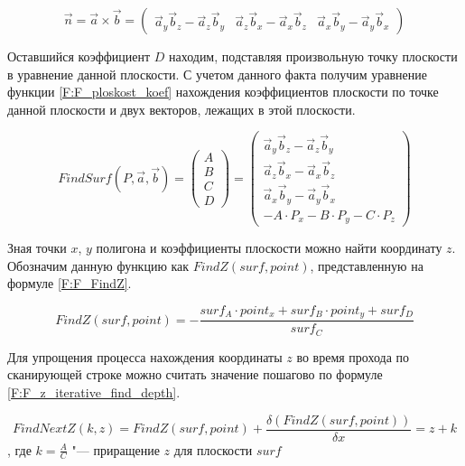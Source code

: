\begin{equation}
    \label{F:vector_scalar}
    \vec{n} = \vec{a} \times \vec{b} = \begin{pmatrix}
        \vec{a}_y \vec{b}_z - \vec{a}_z \vec{b}_y &
        \vec{a}_z \vec{b}_x - \vec{a}_x \vec{b}_z &
        \vec{a}_x \vec{b}_y - \vec{a}_y \vec{b}_x
    \end{pmatrix}
\end{equation}

Оставшийся коэффициент $D$ находим, подставляя произвольную точку плоскости в уравнение данной плоскости. С учетом данного факта получим уравнение функции \eqref{F:F_ploskost_koef} нахождения коэффициентов плоскости по точке данной плоскости и двух векторов, лежащих в этой плоскости.


\begin{equation}
    \label{F:F_ploskost_koef}
    FindSurf(P, \vec{a}, \vec{b}) =
    \begin{pmatrix}
        A \\
        B \\
        C \\
        D
    \end{pmatrix} =
    \begin{pmatrix}
        \vec{a}_y \vec{b}_z - \vec{a}_z \vec{b}_y \\
        \vec{a}_z \vec{b}_x - \vec{a}_x \vec{b}_z \\
        \vec{a}_x \vec{b}_y - \vec{a}_y \vec{b}_x \\
        -A \cdot P_x - B \cdot P_y - C \cdot P_z
    \end{pmatrix}
\end{equation}

Зная точки $x$, $y$ полигона и коэффициенты плоскости можно найти координату $z$. Обозначим данную функцию как $FindZ(surf, point)$, представленную на формуле \eqref{F:F_FindZ}.

\begin{equation}
    \label{F:F_FindZ}
    FindZ(surf, point) = -\frac{surf_A \cdot point_x + surf_B \cdot point_y + surf_D}{surf_C}
\end{equation}

Для упрощения процесса нахождения координаты $z$ во время прохода по сканирующей строке можно считать значение пошагово по формуле \eqref{F:F_z_iterative_find_depth}.

\begin{eqndesc}
    \begin{equation}
        \label{F:F_z_iterative_find_depth}
        FindNextZ(k, z) = FindZ(surf, point)  + \frac{\delta (FindZ(surf, point))}{\delta x} =
        z + k
    \end{equation}
    , где
    $k = \frac{A}{C}$ "--- приращение $z$ для плоскости $surf$
\end{eqndesc}

